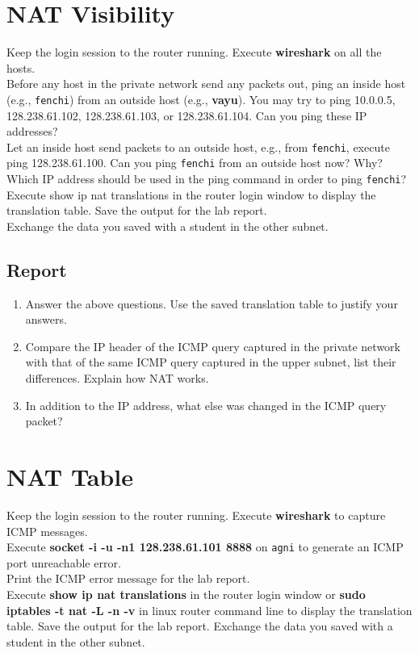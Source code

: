 \documentclass[10pt,a4paper]{article}
\numberwithin{equation}{section}
\numberwithin{figure}{section}
\numberwithin{table}{section}
\begin{document}
    \section*{NAT Visibility}
    Keep the login session to the router running. Execute \textbf{wireshark} on all the hosts. \\
    Before any host in the private network send any packets out, ping an inside host (e.g., \texttt{fenchi}) from an outside host (e.g., \textbf{vayu}). You may try to ping 10.0.0.5, 128.238.61.102, 128.238.61.103, or 128.238.61.104. Can you ping these IP addresses? \\
    Let an inside host send packets to an outside host, e.g., from \texttt{fenchi}, execute ping 128.238.61.100. Can you ping \texttt{fenchi} from an outside host now? Why? Which IP address should be used in the ping command in order to ping \texttt{fenchi}? \\
    Execute show ip nat translations in the router login window to display the translation table. Save the output for the lab report. \\
    Exchange the data you saved with a student in the other subnet.
    \subsection*{Report}
    \begin{enumerate}
        \item Answer the above questions.
        Use the saved translation table to justify your answers.
        \item Compare the IP header of the ICMP query captured in the private network with that of the same ICMP query captured in the upper subnet, list their differences.
        Explain how NAT works.
        \item In addition to the IP address, what else was changed in the ICMP query packet?
    \end{enumerate}


    \section*{NAT Table}
    Keep the login session to the router running. Execute \textbf{wireshark} to capture ICMP messages. \\
    Execute \textbf{socket -i -u -n1 128.238.61.101 8888} on \texttt{agni} to generate an ICMP port unreachable error. \\
    Print the ICMP error message for the lab report. \\
    Execute \textbf{show ip nat translations} in the router login window or \textbf{sudo iptables -t nat -L -n -v} in linux router command line to display the translation table.
    Save the output for the lab report.
    Exchange the data you saved with a student in the other subnet.
\end{document}

